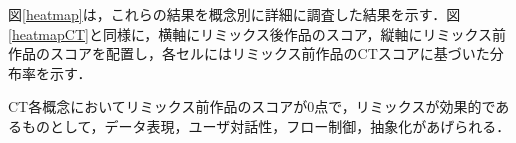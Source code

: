 \documentclass[submit,techrep,noauthor]{ipsj}
\newcommand{\memo}[1]{\colorbox{magenta!30}{\textbf{MEMO}}{\color{red!50}\textbf{[#1]}}}
\begin{document}


図\ref{heatmap}は，これらの結果を概念別に詳細に調査した結果を示す．図\ref{heatmapCT}と同様に，横軸にリミックス後作品のスコア，縦軸にリミックス前作品のスコアを配置し，各セルにはリミックス前作品のCTスコアに基づいた分布率を示す．

CT各概念においてリミックス前作品のスコアが0点で，リミックスが効果的であるものとして，データ表現，ユーザ対話性，フロー制御，抽象化があげられる．






\end{document}
